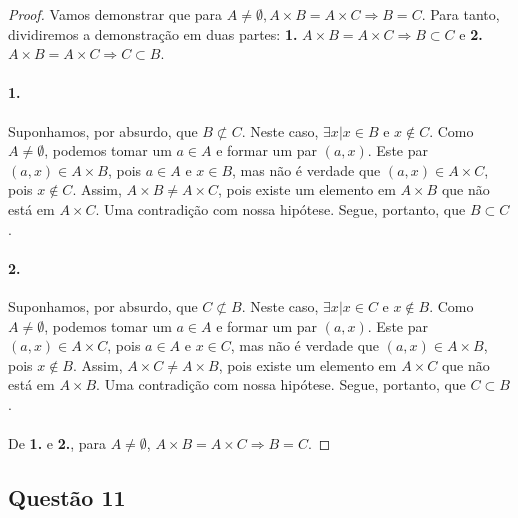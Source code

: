 \documentclass[9pt,twocolumn,a4paper]{article}
\begin{document}
    \begin{proof}
    Vamos demonstrar que para $A \not= \emptyset, A \times B = A \times C \Rightarrow B = C$. Para tanto, dividiremos a demonstração em duas partes: \textbf{1.} $A \times B = A \times C \Rightarrow B \subset C$ e \textbf{2.} $A \times B = A \times C \Rightarrow C \subset B$.

    \paragraph{1.}
    Suponhamos, por absurdo, que $B \not\subset C$. Neste caso, $\exists x | x \in B$ e $x \not\in C$. Como $A \not= \emptyset$, podemos tomar um $a \in A$ e formar um par $(a, x)$. Este par $(a, x) \in A \times B$, pois $a \in A$ e $x \in B$, mas não é verdade que $(a, x) \in A \times C$, pois $x \not\in C$. Assim, $A \times B \not= A \times C$, pois existe um elemento em $A \times B$ que não está em $A \times C$. Uma contradição com nossa hipótese. Segue, portanto, que $B \subset C$.

    \paragraph{2.}
    Suponhamos, por absurdo, que $C \not\subset B$. Neste caso, $\exists x | x \in C$ e $x \not\in B$. Como $A \not= \emptyset$, podemos tomar um $a \in A$ e formar um par $(a, x)$. Este par $(a, x) \in A \times C$, pois $a \in A$ e $x \in C$, mas não é verdade que $(a, x) \in A \times B$, pois $x \not\in B$. Assim, $A \times C \not= A \times B$, pois existe um elemento em $A \times C$ que não está em $A \times B$. Uma contradição com nossa hipótese. Segue, portanto, que $C \subset B$.

    \paragraph{}
    De \textbf{1.} e \textbf{2.}, para $A \not= \emptyset$, $A \times B = A \times C \Rightarrow B = C$.
    \end{proof}

    
    \subsection{Questão 11}
\end{document}
